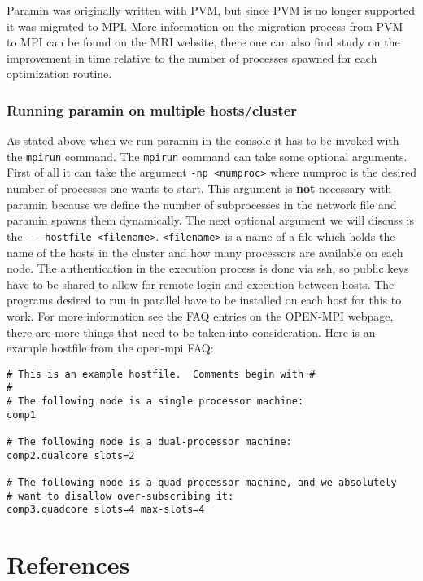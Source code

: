 \documentclass[]{book}
\begin{document}
Paramin was originally written with PVM, but since PVM is no longer
supported it was migrated to MPI. More information on the migration
process from PVM to MPI can be found on the MRI website, there one can
also find study on the improvement in time relative to the number of
processes spawned for each optimization routine.

\hypertarget{running-paramin-on-multiple-hostscluster}{%
\subsection{Running paramin on multiple hosts/cluster}\label{running-paramin-on-multiple-hostscluster}}

As stated above when we run paramin in the console it has to be invoked
with the \texttt{mpirun} command. The \texttt{mpirun} command can take some optional
arguments. First of all it can take the argument \texttt{-np\ \textless{}numproc\textgreater{}} where
numproc is the desired number of processes one wants to start. This
argument is \textbf{not} necessary with paramin because we define the number
of subprocesses in the network file and paramin spawns them dynamically.
The next optional argument we will discuss is the
\(-\end{equation}-\)\texttt{hostfile\ \textless{}filename\textgreater{}}. \texttt{\textless{}filename\textgreater{}} is a name of a file which
holds the name of the hosts in the cluster and how many processors are
available on each node. The authentication in the execution process is
done via ssh, so public keys have to be shared to allow for remote login
and execution between hosts. The programs desired to run in parallel
have to be installed on each host for this to work. For more information
see the FAQ entries on the OPEN-MPI webpage, there are more things that
need to be taken into consideration. Here is an example hostfile from
the open-mpi FAQ:

\begin{verbatim}
# This is an example hostfile.  Comments begin with #
#
# The following node is a single processor machine:
comp1

# The following node is a dual-processor machine:
comp2.dualcore slots=2

# The following node is a quad-processor machine, and we absolutely
# want to disallow over-subscribing it:
comp3.quadcore slots=4 max-slots=4
\end{verbatim}

\hypertarget{chap:reference}{%
\chapter{References}\label{chap:reference}}
\end{document}
